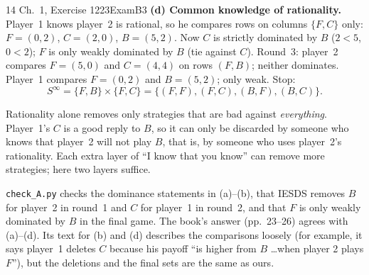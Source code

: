 \begin{exsol}{14}{\MG{} Ch.~1, Exercise 12}{23}{Exam}{B3}
\textbf{(d) Common knowledge of rationality.} Player~1 knows player~2 is rational, so he compares
rows on columns $\{F, C\}$ only: $F = (0, 2)$, $C = (2, 0)$, $B = (5, 2)$. Now $C$ is strictly
dominated by $B$ ($2 < 5$, $0 < 2$); $F$ is only weakly dominated by $B$ (tie against $C$).
Round~3: player~2 compares $F = (5, 0)$ and $C = (4, 4)$ on rows $(F, B)$; neither dominates.
Player~1 compares $F = (0, 2)$ and $B = (5, 2)$; only weak. Stop:
\[
  S^\infty = \{F, B\} \times \{F, C\} = \{(F,F), (F,C), (B,F), (B,C)\}.
\]

\interp Rationality alone removes only strategies that are bad against \emph{everything}.
Player~1's $C$ is a good reply to $B$, so it can only be discarded by someone who knows that
player~2 will not play $B$, that is, by someone who uses player~2's rationality. Each extra layer
of ``I know that you know'' can remove more strategies; here two layers suffice.

\verify \texttt{check\_A.py} checks the dominance statements in (a)--(b), that IESDS removes $B$
for player~2 in round~1 and $C$ for player~1 in round~2, and that $F$ is only weakly dominated
by $B$ in the final game. The book's answer (pp.~23--26) agrees with (a)--(d). Its text for (b)
and (d) describes the comparisons loosely (for example, it says player~1 deletes $C$ because his
payoff ``is higher from $B$ \dots when player 2 plays $F$''), but the deletions and the final
sets are the same as ours.

\end{exsol}
